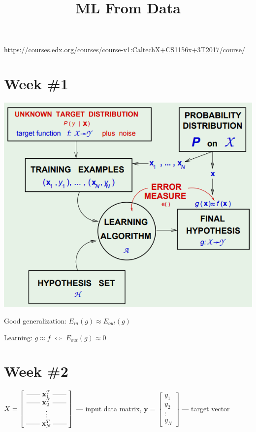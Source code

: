\documentclass[a4paper,11pt]{article}
\title{ML From Data}
\author{}
\date{}
\renewcommand{\vec}[1]{\mathbf{#1}}
\begin{document}
\maketitle

\url{https://courses.edx.org/courses/course-v1:CaltechX+CS1156x+3T2017/course/}



\section{Week \#1}

\includegraphics[scale=.66]{structure.png}

Good generalization: $E_{in}(g) \approx E_{out}(g)$

Learning: $g \approx f$  $\Longleftrightarrow$  $E_{out}(g) \approx 0$

\textellipsis



\section{Week \#2}

\def\iiside{\; \rule[.5ex]{2.0em}{0.2pt} \;}
\def\iicode#1{\texttt{#1}}

\def\iiEin{E_{in}}
\def\iiEout{E_{out}}
\def\iiE{\mathbb{E}}
\def\iiD{\mathcal{D}}
\def\iiH{\mathcal{H}}
\def\iiX{\mathcal{X}}
\def\iiw{\vec{w}}
\def\iix{\vec{x}}
\def\iiy{\vec{y}}

$ X = \begin{bmatrix}
        \iiside \vec{x}_1^T \iiside \\
        \iiside \vec{x}_2^T \iiside \\
                 \vdots             \\
        \iiside \vec{x}_N^T \iiside
      \end{bmatrix} $
--- input data matrix,
$ \vec{y} = \begin{bmatrix} y_1 \\ y_2 \\ \vdots \\ y_N \end{bmatrix} $
--- target vector
\end{document}
